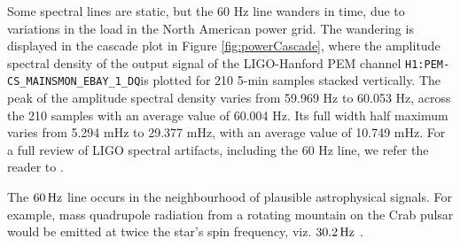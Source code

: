 \documentclass[pra,superscriptaddress,reprint,amsmath,amssymb,nofootinbib]{revtex4-2}
\newcommand{\CSOneName}{\texttt{H1:PEM-CS\_MAINSMON\_EBAY\_1\_DQ}}
\begin{document}
Some spectral lines are static, but the 60 Hz line wanders in time, due to variations in the load in the North American power grid. The wandering is displayed in the cascade plot in Figure \ref{fig:powerCascade}, where the amplitude spectral density of the output signal of the LIGO-Hanford PEM channel \CSOneName is plotted for 210 5-min samples stacked vertically. The peak of the amplitude spectral density varies from 59.969 Hz  to 60.053 Hz, across the 210 samples with an average value of 60.004 Hz. Its full width half maximum varies from 5.294 mHz to 29.377 mHz, with an average value of 10.749  mHz. For a full review of LIGO spectral artifacts, including the 60 Hz line, we refer the reader to \cite{CovasEtAl:2018}. \newline 


The $60 \, {\rm Hz}$ line occurs in the neighbourhood of plausible astrophysical signals. For example, mass quadrupole radiation from a rotating mountain on the Crab pulsar would be emitted at twice the star's spin frequency, viz. $30.2 \, {\rm Hz}$ \citep{Wette2023} \citep{Riles2023}.
\end{document}
